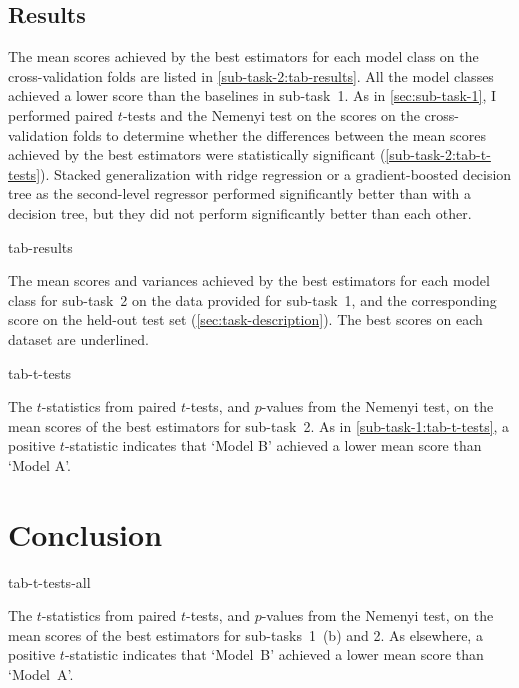 \subsection{Results}
\label{sec:sub-task-2:results}

The mean scores achieved by the best estimators for each model class on the
cross-validation folds are listed in \cref{sub-task-2:tab-results}.
All the model classes achieved a lower score than the baselines in sub-task~1.
As in \cref{sec:sub-task-1}, I performed paired $t$-tests and the Nemenyi test on the
scores on the cross-validation folds to determine whether the differences between the
mean scores achieved by the best estimators were statistically significant
(\cref{sub-task-2:tab-t-tests}).
Stacked generalization with ridge regression or a gradient-boosted decision tree as the
second-level regressor performed significantly better than with a decision tree, but
they did not perform significantly better than each other.

\begin{table}
  \centering
  {tab-results}
  \caption{
    The mean scores and variances achieved by the best estimators for each model class
    for sub-task~2 on the data provided for sub-task~1, and the corresponding score on
    the held-out test set (\cref{sec:task-description}).
    The best scores on each dataset are underlined.
  }
  \label{sub-task-2:tab-results}
\end{table}

\begin{table}
  \centering
  {tab-t-tests}
  \caption{
    The $t$-statistics from paired $t$-tests, and $p$-values from the Nemenyi test, on
    the mean scores of the best estimators for sub-task~2.
    As in \cref{sub-task-1:tab-t-tests}, a positive $t$-statistic indicates that `Model B'
    achieved a lower mean score than `Model A'.
  }
  \label{sub-task-2:tab-t-tests}
\end{table}

\section{Conclusion}

\begin{table}
  \centering
  {tab-t-tests-all}
  \caption{
    The $t$-statistics from paired $t$-tests, and $p$-values from the Nemenyi test, on
    the mean scores of the best estimators for sub-tasks~1~(b) and 2.
    As elsewhere, a positive $t$-statistic indicates that `Model~B' achieved a lower mean
    score than `Model~A'.
  }
  \label{sub-task-2:tab-t-tests-all}
\end{table}

